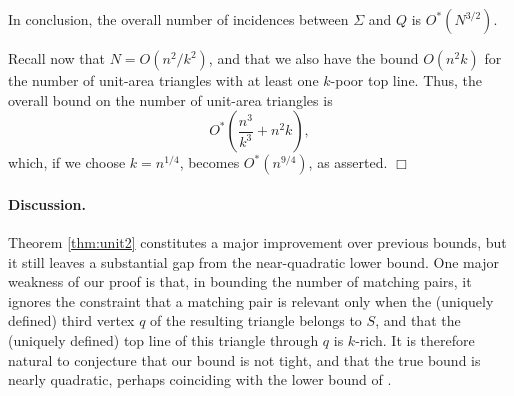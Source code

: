\documentclass[12pt]{article}
\begin{document}
In conclusion, the overall number of incidences between $\Sigma$ and
$Q$ is $O^*(N^{3/2})$.

Recall now that $N=O(n^2/k^2)$, and that we also have the bound $O(n^2k)$
for the number of unit-area triangles with at least one $k$-poor
top line. Thus, the overall bound on the number of unit-area triangles
is
$$
O^*\left( \frac{n^3}{k^3} + n^2k\right) ,
$$
which, if we choose $k=n^{1/4}$, becomes $O^*(n^{9/4})$, as
asserted.
$\Box$

\paragraph{Discussion.}
Theorem \ref{thm:unit2} constitutes a major improvement over previous
bounds, but it still leaves a substantial gap from the near-quadratic
lower bound. One major weakness of our proof is that, in bounding the
number of matching pairs, it ignores the constraint that a matching
pair is relevant only when the (uniquely defined) third vertex $q$ of
the resulting triangle belongs to $S$, and that the (uniquely defined)
top line of this triangle through $q$ is $k$-rich. It is therefore
natural to conjecture that our bound is not tight, and that the true
bound is nearly quadratic, perhaps coinciding with the lower bound of
\cite{EP71}.
\end{document}
